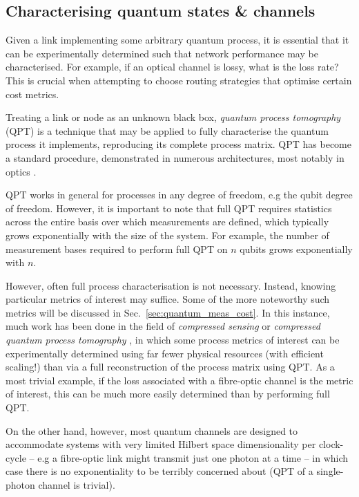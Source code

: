 %
%

\subsection{Characterising quantum states \& channels} \label{sec:QPT}

Given a link implementing some arbitrary quantum process, it is essential that it can be experimentally determined such that network performance may be characterised. For example, if an optical channel is lossy, what is the loss rate? This is crucial when attempting to choose routing strategies that optimise certain cost metrics.

Treating a link or node as an unknown black box, \textit{quantum process tomography} (QPT) \cite{bib:ChuangNielsen97, ???} is a technique that may be applied to fully characterise the quantum process it implements, reproducing its complete process matrix. QPT has become a standard procedure, demonstrated in numerous architectures, most notably in optics \cite{bib:OBrien04, bib:RohdeGateChar05}.

QPT works in general for processes in any degree of freedom, e.g the qubit degree of freedom. However, it is important to note that full QPT requires statistics across the entire basis over which measurements are defined, which typically grows exponentially with the size of the system. For example, the number of measurement bases required to perform full QPT on $n$ qubits grows exponentially with $n$.

However, often full process characterisation is not necessary. Instead, knowing particular metrics of interest may suffice. Some of the more noteworthy such metrics will be discussed in Sec.~\ref{sec:quantum_meas_cost}. In this instance, much work has been done in the field of \textit{compressed sensing} or \textit{compressed quantum process tomography} \cite{???,compressed_sensing}, in which some process metrics of interest can be experimentally determined using far fewer physical resources (with efficient scaling!) than via a full reconstruction of the process matrix using QPT. As a most trivial example, if the loss associated with a fibre-optic channel is the metric of interest, this can be much more easily determined than by performing full QPT.

On the other hand, however, most quantum channels are designed to accommodate systems with very limited Hilbert space dimensionality per clock-cycle -- e.g a fibre-optic link might transmit just one photon at a time -- in which case there is no exponentiality to be terribly concerned about (QPT of a single-photon channel is trivial).

